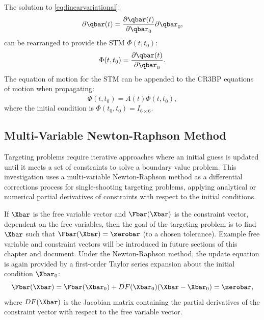The solution to \cref{eq:linearvariational}:
\begin{equation}
    \partial\qbar(t)=\frac{\partial\qbar(t)}{\partial\qbar_{0}}\partial\qbar_{0},
    \label{eq:variationalsolution}
\end{equation}
can be rearranged to provide the STM $\Phi(t,t_{0})$:
\begin{equation}
    \Phi(t,t_{0})=\frac{\partial\qbar(t)}{\partial\qbar_{{0}}}.
    \label{eq:STM}
\end{equation}
The equation of motion for the STM can be appended to the CR3BP equations of motion when
propagating:
\begin{equation}
    \dot{\Phi}(t,t_{0})=A(t)\Phi(t,t_{0}),
    \label{eq:STMEoM}
\end{equation}
where the initial condition is $\Phi(t_{0},t_{0})=I_{6\times6}$.

\subsection{Multi-Variable Newton-Raphson Method}
Targeting problems require iterative approaches where an initial guess is updated until it meets a
set of constraints to solve a boundary value problem. This investigation uses a multi-variable
Newton-Raphson method as a differential corrections process for single-shooting targeting problems,
applying analytical or numerical partial derivatives of constraints with respect to the initial
conditions.

If $\Xbar$ is the free variable vector and $\Fbar(\Xbar)$ is the constraint vector, dependent on
the free variables, then the goal of the targeting problem is to find $\Xbar$ such that
$\Fbar(\Xbar)=\zerobar$ (to a chosen tolerance). Example free variable and constraint vectors will
be introduced in future sections of this chapter and document. Under the Newton-Raphson method, the
update equation is again provided by a first-order Taylor series expansion about the initial
condition $\Xbar_{0}$:
\begin{equation}
    \Fbar(\Xbar)=\Fbar(\Xbar_{0})+DF(\Xbar_{0})(\Xbar-\Xbar_{0})=\zerobar,
    \label{eq:updateequation}
\end{equation}
where $DF(\Xbar)$ is the Jacobian matrix containing the partial derivatives of the constraint
vector with respect to the free variable vector.

